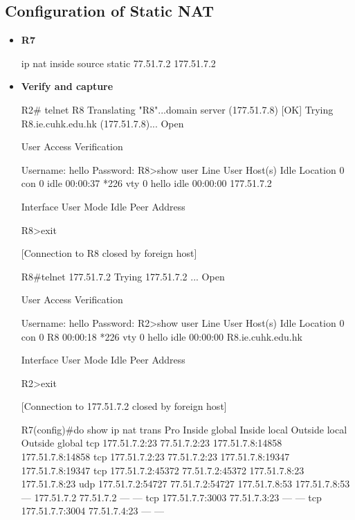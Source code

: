 \documentclass[10pt]{article}
\begin{document}
\subsection{Configuration of Static NAT}
\begin{itemize}
\item {\bf R7}
\begin{verbatim*}
ip nat inside source static 77.51.7.2 177.51.7.2
\end{verbatim*}
\item {\bf Verify and capture}
\begin{verbatim*}
R2# telnet R8
Translating "R8"...domain server (177.51.7.8) [OK]
Trying R8.ie.cuhk.edu.hk (177.51.7.8)... Open


User Access Verification

Username: hello
Password:
R8>show user
Line       User       Host(s)              Idle       Location
0 con 0                idle                 00:00:37
*226 vty 0     hello      idle                 00:00:00 177.51.7.2

Interface    User               Mode         Idle     Peer Address

R8>exit

[Connection to R8 closed by foreign host]

R8#telnet 177.51.7.2
Trying 177.51.7.2 ... Open


User Access Verification

Username: hello
Password:
R2>show user
Line       User       Host(s)              Idle       Location
0 con 0                R8                   00:00:18
*226 vty 0     hello      idle                 00:00:00 R8.ie.cuhk.edu.hk

Interface    User               Mode         Idle     Peer Address

R2>exit

[Connection to 177.51.7.2 closed by foreign host]



R7(config)#do show ip nat trans
Pro Inside global      Inside local       Outside local      Outside global
tcp 177.51.7.2:23      77.51.7.2:23       177.51.7.8:14858   177.51.7.8:14858
tcp 177.51.7.2:23      77.51.7.2:23       177.51.7.8:19347   177.51.7.8:19347
tcp 177.51.7.2:45372   77.51.7.2:45372    177.51.7.8:23      177.51.7.8:23
udp 177.51.7.2:54727   77.51.7.2:54727    177.51.7.8:53      177.51.7.8:53
--- 177.51.7.2         77.51.7.2          ---                ---
tcp 177.51.7.7:3003    77.51.7.3:23       ---                ---
tcp 177.51.7.7:3004    77.51.7.4:23       ---                ---
\end{verbatim*}
\end{itemize}
\end{document}
